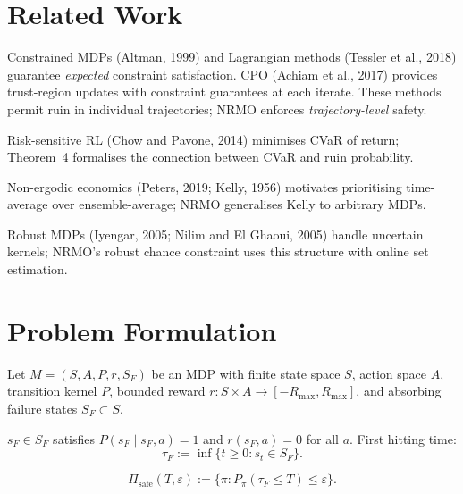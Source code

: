 \section{Related Work}
\label{sec:arxiv-related-work}

Constrained MDPs (Altman, 1999) and Lagrangian methods (Tessler et
al., 2018) guarantee \emph{expected} constraint satisfaction. CPO
(Achiam et al., 2017) provides trust-region updates with constraint
guarantees at each iterate. These methods permit ruin in individual
trajectories; NRMO enforces \emph{trajectory-level} safety.

Risk-sensitive RL (Chow and Pavone, 2014) minimises CVaR of return;
Theorem~4 formalises the connection between CVaR and ruin
probability.

Non-ergodic economics (Peters, 2019; Kelly, 1956) motivates
prioritising time-average over ensemble-average; NRMO generalises
Kelly to arbitrary MDPs.

Robust MDPs (Iyengar, 2005; Nilim and El Ghaoui, 2005) handle
uncertain kernels; NRMO's robust chance constraint uses this
structure with online set estimation.

\section{Problem Formulation}
\label{sec:arxiv-formulation}

Let $M = (S, A, P, r, S_F)$ be an MDP with finite state space $S$,
action space $A$, transition kernel $P$, bounded reward
$r: S \times A \to [-R_{\max}, R_{\max}]$, and absorbing failure
states $S_F \subset S$.

\begin{definition}
\label{def:arxiv-absorbing}
$s_F \in S_F$ satisfies $P(s_F \mid s_F, a) = 1$ and
$r(s_F, a) = 0$ for all $a$. First hitting time:
\begin{equation}
\tau_F := \inf\{t \ge 0 : s_t \in S_F\}.
\end{equation}
\end{definition}

\begin{definition}
\label{def:arxiv-admissible}
\begin{equation}
\Pi_{\mathrm{safe}}(T, \varepsilon) :=
\{\pi : P_\pi(\tau_F \le T) \le \varepsilon\}.
\end{equation}
\end{definition}

